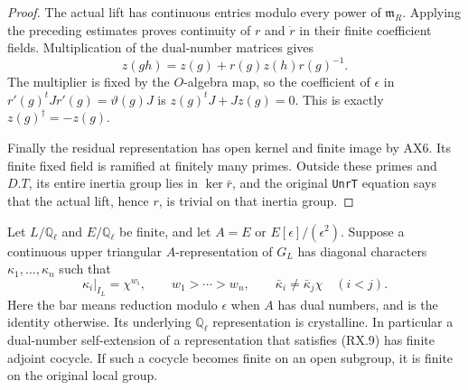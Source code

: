 \begin{proof}
The actual lift has continuous entries modulo every power of
$\mathfrak m_R$.  Applying the preceding estimates proves continuity
of $r$ and $\dot r$ in their finite coefficient fields.  Multiplication
of the dual-number matrices gives
\[
 z(gh)=z(g)+r(g)z(h)r(g)^{-1}.
 \tag{RX.8}
\]
The multiplier is fixed by the $O$-algebra map, so the coefficient of
$\epsilon$ in
$r'(g)^tJr'(g)=\vartheta(g)J$ is
$z(g)^tJ+Jz(g)=0$.  This is exactly $z(g)^\dagger=-z(g)$.

Finally the residual representation has open kernel and finite image
by AX6.  Its finite fixed field is ramified at finitely many primes.
Outside these primes and $D.T$, its entire inertia group lies in
$\ker\bar r$, and the original \texttt{UnrT} equation says that the
actual lift, hence $r$, is trivial on that inertia group.
\end{proof}

\begin{proposition}
\label{prop:rx-ordinary-crystalline}
Let $L/\mathbb Q_\ell$ and $E/\mathbb Q_\ell$ be finite, and let
$A=E$ or $E[\epsilon]/(\epsilon^2)$.  Suppose a continuous upper
triangular $A$-representation of $G_L$ has diagonal characters
$\kappa_1,\ldots,\kappa_n$ such that
\[
 \kappa_i|_{I_L}=\chi^{w_i},\qquad
 w_1>\cdots>w_n,\qquad
 \bar\kappa_i\ne\bar\kappa_j\chi\quad(i<j).
 \tag{RX.9}
\]
Here the bar means reduction modulo $\epsilon$ when $A$ has dual
numbers, and is the identity otherwise.  Its underlying
$\mathbb Q_\ell$ representation is crystalline.
In particular a dual-number self-extension of a representation that
satisfies (RX.9) has finite adjoint cocycle.  If such a cocycle becomes
finite on an open subgroup, it is finite on the original local group.
\end{proposition}

